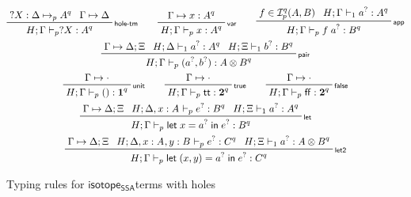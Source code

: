 \documentclass[acmsmall,screen,review]{acmart}
\newcommand{\mc}[1]{\ensuremath{\mathcal{#1}}}
\newcommand{\mb}[1]{\ensuremath{\mathbf{#1}}}
\newcommand{\ms}[1]{\ensuremath{\mathsf{#1}}}
\newcommand{\lbl}[1]{{`#1}}
\newcommand{\ctt}{\ms{tt}}
\newcommand{\cff}{\ms{ff}}
\newcommand{\letexpr}[3]{\ensuremath{\ms{let}\;#1 = #2\;\ms{in}\;#3}}
\newcommand{\csplits}[3]{#1 \mapsto #2;#3}
\newcommand{\cwk}[2]{#1 \mapsto #2}
\newcommand{\thyp}[3]{#1: {#2}^{#3}}
\newcommand{\lhyp}[3]{#1[#2](#3)}
\newcommand{\llhyp}[3]{\lhyp{\lbl{#1}}{#2}{#3}}
\newcommand{\rle}[1]{{\scriptsize\textsf{#1}}}
\newcommand{\mhole}[1]{{#1}^?}
\newcommand{\lhole}[1]{?#1}
\newcommand{\mhasty}[6]{#1;#2 \vdash_{#3} #4: {#5}^{#6}}
\newcommand{\mhaslb}[4]{#1;#2 \vdash #3 \rhd #4}
\newcommand{\tyhole}[5]{#1: #2 \mapsto_{#3} {#4}^{#5}}
\newcommand{\isotopessa}{\ms{isotope_{SSA}}}
\begin{document}
\begin{figure}
  \begin{gather*}    
    \prftree[r]{\rle{hole-tm}}
      {\tyhole{\lhole{X}}{\Delta}{p}{A}{q}}
      {\cwk{\Gamma}{\Delta}}
      {\mhasty{H}{\Gamma}{p}{\lhole{X}}{A}{q}} \qquad
    \prftree[r]{\rle{var}}
      {\cwk{\Gamma}{\thyp{x}{A}{q}}}
      {\mhasty{H}{\Gamma}{p}{x}{A}{q}} \qquad
    \prftree[r]{\rle{app}}
      {f \in \mc{I}_p^q(A, B)}
      {\mhasty{H}{\Gamma}{1}{\mhole{a}}{A}{q}}
      {\mhasty{H}{\Gamma}{p}{f\;\mhole{a}}{B}{q}} \\
    \prftree[r]{\rle{pair}}
      {\csplits{\Gamma}{\Delta}{\Xi}}
      {\mhasty{H}{\Delta}{1}{\mhole{a}}{A}{q}}
      {\mhasty{H}{\Xi}{1}{\mhole{b}}{B}{q}}
      {\mhasty{H}{\Gamma}{p}{(\mhole{a}, \mhole{b})}{A \otimes B}{q}} \\
    \prftree[r]{\rle{unit}}
      {\cwk{\Gamma}{\cdot}}
      {\mhasty{H}{\Gamma}{p}{()}{\mb{1}}{q}} \qquad
    \prftree[r]{\rle{true}}
      {\cwk{\Gamma}{\cdot}}
      {\mhasty{H}{\Gamma}{p}{\ctt}{\mb{2}}{q}} \qquad
    \prftree[r]{\rle{false}}
      {\cwk{\Gamma}{\cdot}}
      {\mhasty{H}{\Gamma}{p}{\cff}{\mb{2}}{q}} \\
    \prftree[r]{\rle{let}}
      {\csplits{\Gamma}{\Delta}{\Xi}}
      {\mhasty{H}{\Delta, \thyp{x}{A}{}}{p}{\mhole{e}}{B}{q}}
      {\mhasty{H}{\Xi}{1}{\mhole{a}}{A}{q}}
      {\mhasty{H}{\Gamma}{p}{\letexpr{x}{\mhole{a}}{\mhole{e}}}{B}{q}} \qquad
      \\
    \prftree[r]{\rle{let2}}
      {\csplits{\Gamma}{\Delta}{\Xi}}
      {\mhasty{H}{\Delta, \thyp{x}{A}{}, \thyp{y}{B}{}}{p}{\mhole{e}}{C}{q}}
      {\mhasty{H}{\Xi}{1}{\mhole{a}}{A \otimes B}{q}}
      {\mhasty{H}{\Gamma}{p}{\letexpr{(x, y)}{\mhole{a}}{\mhole{e}}}{C}{q}}
  \end{gather*}
  \caption{Typing rules for \isotopessa terms with holes}
  \label{fig:ssa-term-holes-typing}
\end{figure}
\end{document}
